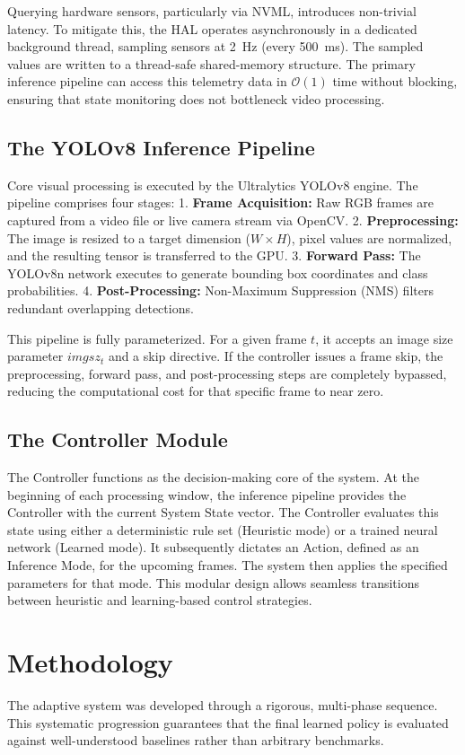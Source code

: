 \documentclass{ieeeaccess}
\begin{document}
Querying hardware sensors, particularly via NVML, introduces non-trivial latency. To mitigate this, the HAL operates asynchronously in a dedicated background thread, sampling sensors at 2~Hz (every 500~ms). The sampled values are written to a thread-safe shared-memory structure. The primary inference pipeline can access this telemetry data in $\mathcal{O}(1)$ time without blocking, ensuring that state monitoring does not bottleneck video processing.

\subsection{The YOLOv8 Inference Pipeline}
Core visual processing is executed by the Ultralytics YOLOv8 engine. The pipeline comprises four stages:
1. \textbf{Frame Acquisition:} Raw RGB frames are captured from a video file or live camera stream via OpenCV.
2. \textbf{Preprocessing:} The image is resized to a target dimension ($W \times H$), pixel values are normalized, and the resulting tensor is transferred to the GPU.
3. \textbf{Forward Pass:} The YOLOv8n network executes to generate bounding box coordinates and class probabilities.
4. \textbf{Post-Processing:} Non-Maximum Suppression (NMS) filters redundant overlapping detections.

This pipeline is fully parameterized. For a given frame $t$, it accepts an image size parameter $imgsz_t$ and a skip directive. If the controller issues a frame skip, the preprocessing, forward pass, and post-processing steps are completely bypassed, reducing the computational cost for that specific frame to near zero.

\subsection{The Controller Module}
The Controller functions as the decision-making core of the system. At the beginning of each processing window, the inference pipeline provides the Controller with the current System State vector. The Controller evaluates this state using either a deterministic rule set (Heuristic mode) or a trained neural network (Learned mode). It subsequently dictates an Action, defined as an Inference Mode, for the upcoming frames. The system then applies the specified parameters for that mode. This modular design allows seamless transitions between heuristic and learning-based control strategies.

\section{Methodology}
\label{sec:methodology}
The adaptive system was developed through a rigorous, multi-phase sequence. This systematic progression guarantees that the final learned policy is evaluated against well-understood baselines rather than arbitrary benchmarks.
\end{document}
